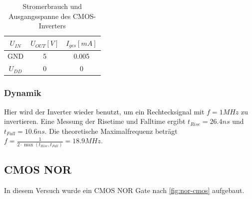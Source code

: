 \documentclass[a4paper]{article}
\newcommand{\trise}{t_\textit{Rise}}
\newcommand{\tfall}{t_\textit{Fall}}
\newcommand{\risetime}[2]{\trise=#1\si{#2}}
\newcommand{\falltime}[2]{\tfall=#1\si{#2}}
\newcommand{\stromverbrauchtable}[4]{
    \begin{tabular}{S|S|S}
        {$U_{IN}$} & {$U_{OUT}[V]$} & {$I_{ges}[mA]$}\\
        \hline
        {GND} & #1 & #2\\
        {$U_{DD}$} & #3 & #4
    \end{tabular}
}
\begin{document}
\begin{table}[H]
    \centering
    \stromverbrauchtable{5}{0.005}{0}{0}
    \caption{Stromerbrauch und Ausgangsspanne des CMOS-Inverters}
    \label{tab:cmos-inverter}
\end{table}

\subsubsection{Dynamik}

Hier wird der Inverter wieder benutzt, um ein Rechtecksignal mit $f=1\si{MHz}$ zu invertieren.
Eine Messung der Risetime und Falltime ergibt $\risetime{26.4}{ns}$ und $\falltime{10.6}{ns}$.
Die theoretische Maximalfrequenz beträgt $f=\frac{1}{2\cdot \max(\trise , \tfall)}=18.9\si{MHz}$.




\subsection{CMOS NOR}
In diesem Versuch wurde ein CMOS NOR Gate nach \autoref{fig:nor-cmos} aufgebaut.
\end{document}
